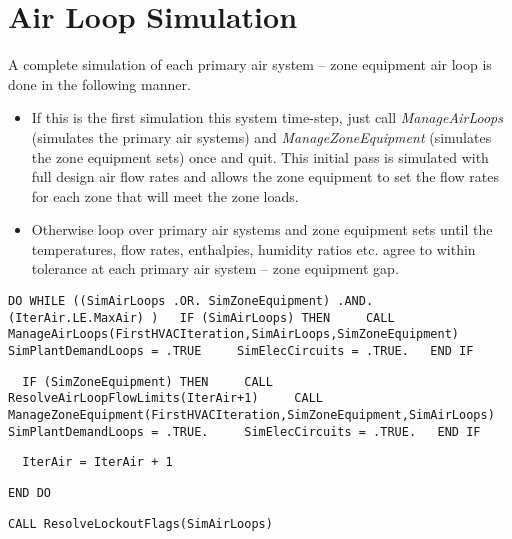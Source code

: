 \section{Air Loop Simulation}\label{air-loop-simulation}

A complete simulation of each primary air system -- zone equipment air loop is done in the following manner.

\begin{itemize}
\item
  If this is the first simulation this system time-step, just call \emph{ManageAirLoops} (simulates the primary air systems) and \emph{ManageZoneEquipment} (simulates the zone equipment sets) once and quit. This initial pass is simulated with full design air flow rates and allows the zone equipment to set the flow rates for each zone that will meet the zone loads.
\item
  Otherwise loop over primary air systems and zone equipment sets until the temperatures, flow rates, enthalpies, humidity ratios etc. agree to within tolerance at each primary air system -- zone equipment gap. 
\end{itemize}

\begin{lstlisting}
DO WHILE ((SimAirLoops .OR. SimZoneEquipment) .AND. (IterAir.LE.MaxAir) )   IF (SimAirLoops) THEN     CALL ManageAirLoops(FirstHVACIteration,SimAirLoops,SimZoneEquipment)     SimPlantDemandLoops = .TRUE     SimElecCircuits = .TRUE.   END IF
\end{lstlisting}

\begin{lstlisting}
  IF (SimZoneEquipment) THEN     CALL ResolveAirLoopFlowLimits(IterAir+1)     CALL ManageZoneEquipment(FirstHVACIteration,SimZoneEquipment,SimAirLoops)     SimPlantDemandLoops = .TRUE.     SimElecCircuits = .TRUE.   END IF
\end{lstlisting}

\begin{lstlisting}
  IterAir = IterAir + 1
\end{lstlisting}

\begin{lstlisting}
END DO
\end{lstlisting}

\begin{lstlisting}
CALL ResolveLockoutFlags(SimAirLoops)
\end{lstlisting}

